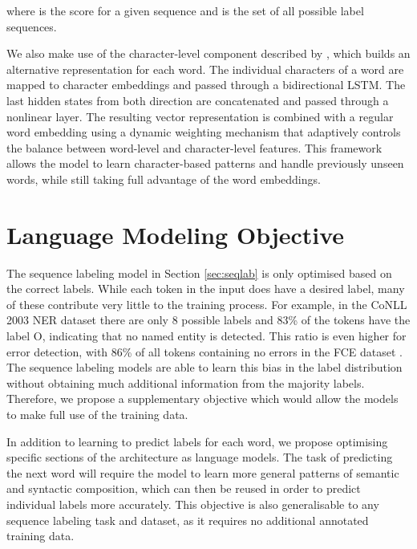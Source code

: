 \documentclass[11pt,a4paper]{article}
\begin{document}
\noindent where  is the score for a given sequence  and  is the set of all possible label sequences.

We also make use of the character-level component described by , which builds an alternative representation for each word. The individual characters of a word are mapped to character embeddings and passed through a bidirectional LSTM. The last hidden states from both direction are concatenated and passed through a nonlinear layer.
The resulting vector representation is combined with a regular word embedding using a dynamic weighting mechanism that adaptively controls the balance between word-level and character-level features.
This framework allows the model to learn character-based patterns and handle previously unseen words, while still taking full advantage of the word embeddings.


\section{Language Modeling Objective}
\label{sec:lmcost}


The sequence labeling model in Section \ref{sec:seqlab} is only optimised based on the correct labels.
While each token in the input does have a desired label, many of these contribute very little to the training process. For example, in the CoNLL 2003 NER dataset \cite{TjongKimSang2003} there are only 8 possible labels and 83\% of the tokens have the label O, indicating that no named entity is detected.
This ratio is even higher for error detection, with 86\% of all tokens containing no errors in the FCE dataset \cite{Yannakoudakis2011}.
The sequence labeling models are able to learn this bias in the label distribution without obtaining much additional information from the majority labels.
Therefore, we propose a supplementary objective which would allow the models to make full use of the training data.

In addition to learning to predict labels for each word, we propose optimising specific sections of the architecture as language models. 
The task of predicting the next word will require the model to learn more general patterns of semantic and syntactic composition, which can then be reused in order to predict individual labels more accurately. This objective is also generalisable to any sequence labeling task and dataset, as it requires no additional annotated training data. 
\end{document}
